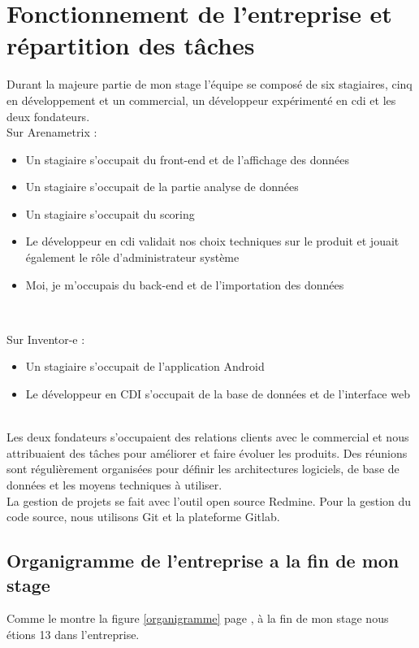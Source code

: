 \section{Fonctionnement de l'entreprise et répartition des tâches}
Durant la majeure partie de mon stage l'équipe se composé de six stagiaires, cinq en développement et un commercial, un développeur expérimenté en cdi et les deux fondateurs. \\

Sur Arenametrix : 
\begin{itemize}
  \item[\textbullet] Un stagiaire s'occupait du front-end et de l'affichage des données
  \item[\textbullet] Un stagiaire s'occupait de la partie analyse de données
  \item[\textbullet] Un stagiaire s'occupait du scoring
  \item[\textbullet] Le développeur en cdi validait nos choix techniques sur le produit et jouait également le rôle d'administrateur système
  \item[\textbullet]Moi, je m'occupais du back-end et de l'importation des données
\end{itemize} \

Sur Inventor-e : 
\begin{itemize}
  \item[\textbullet] Un stagiaire s'occupait de l'application Android
  \item[\textbullet] Le développeur en CDI s'occupait de la base de données et de l'interface web
\end{itemize}

\leavevmode
\\
Les deux fondateurs s'occupaient des relations clients avec le commercial et nous attribuaient des tâches pour améliorer et faire évoluer les produits. Des réunions sont régulièrement organisées pour définir les architectures logiciels, de base de données et les moyens techniques à utiliser. 
\\ 

La gestion de projets se fait avec l'outil open source Redmine. Pour la gestion du code source, nous utilisons Git et la plateforme Gitlab.

\subsection{Organigramme de l'entreprise a la fin de mon stage}
Comme le montre la figure \ref{organigramme} page \pageref{organigramme}, à la fin de mon stage nous étions 13 dans l'entreprise. 

